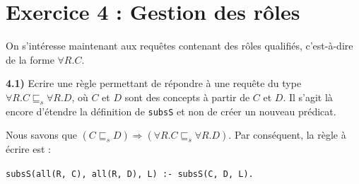 \documentclass[a4paper,12pt]{report}
\begin{document}

\newpage
\section*{Exercice 4 : Gestion des rôles}

On s'intéresse maintenant aux requêtes contenant des rôles qualifiés, c'est-à-dire de la forme \(\forall R.C\).




\vspace{0.5cm}

{}

\textbf{4.1)} Ecrire une règle permettant de répondre à une requête du type \(\forall R.C \sqsubseteq_s \forall R.D \), où \(C\) et \(D\) sont des concepts à partir de
    \(C\) et \(D\). Il s'agit là encore d'étendre la définition de \texttt{subsS} et non de créer un nouveau prédicat.



\begin{tcolorbox}[colback=gray!10, colframe=blue!30, coltitle=black, title=Réponse à la question 4.1 - 1/1]

    Nous savons que \((C \sqsubseteq_s D) \Rightarrow (\forall R.C \sqsubseteq_s \forall R.D)\). Par conséquent, la règle à écrire est :
    \begin{center}
        \texttt{subsS(all(R, C), all(R, D), L) :- subsS(C, D, L).}
    \end{center}

\end{tcolorbox}




\vspace{0.5cm}

{}
\end{document}
